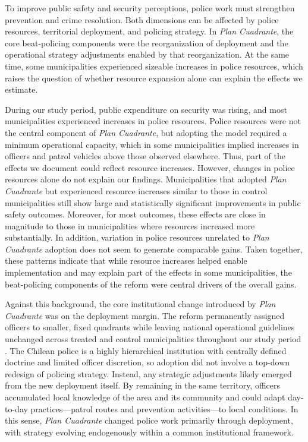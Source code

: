 To improve public safety and security perceptions, police work must strengthen prevention and crime resolution. Both dimensions can be affected by police resources, territorial deployment, and policing strategy. In \emph{Plan Cuadrante}, the core beat-policing components were the reorganization of deployment and the operational strategy adjustments enabled by that reorganization. At the same time, some municipalities experienced sizeable increases in police resources, which raises the question of whether resource expansion alone can explain the effects we estimate.

During our study period, public expenditure on security was rising, and most municipalities experienced increases in police resources. Police resources were not the central component of \emph{Plan Cuadrante}, but adopting the model required a minimum operational capacity, which in some municipalities implied increases in officers and patrol vehicles above those observed elsewhere. Thus, part of the effects we document could reflect resource increases. However, changes in police resources alone do not explain our findings. Municipalities that adopted \emph{Plan Cuadrante} but experienced resource increases similar to those in control municipalities still show large and statistically significant improvements in public safety outcomes. Moreover, for most outcomes, these effects are close in magnitude to those in municipalities where resources increased more substantially. In addition, variation in police resources unrelated to \emph{Plan Cuadrante} adoption does not seem to generate comparable gains. Taken together, these patterns indicate that while resource increases helped enable implementation and may explain part of the effects in some municipalities, the beat-policing components of the reform were central drivers of the overall gains.

Against this background, the core institutional change introduced by \emph{Plan Cuadrante} was on the deployment margin. The reform permanently assigned officers to smaller, fixed quadrants while leaving national operational guidelines unchanged across treated and control municipalities throughout our study period \citep{Manual_Carabineros2018,DIPRES2007_largo}. The Chilean police is a highly hierarchical institution with centrally defined doctrine and limited officer discretion, so adoption did not involve a top-down redesign of policing strategy. Instead, any strategic adjustments likely emerged from the new deployment itself. By remaining in the same territory, officers accumulated local knowledge of the area and its community and could adapt day-to-day practices---patrol routes and prevention activities---to local conditions. In this sense, \emph{Plan Cuadrante} changed police work primarily through deployment, with strategy evolving endogenously within a common institutional framework.

